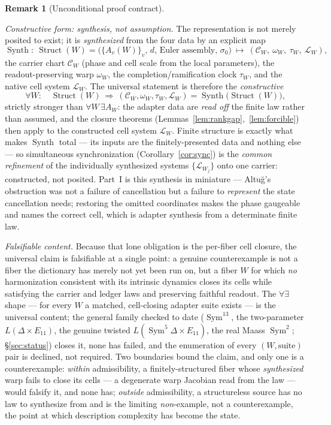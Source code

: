 \documentclass[11pt]{article}
\theoremstyle{definition}
\newtheorem{remark}[theorem]{Remark}
\newcommand{\Sym}{\operatorname{Sym}}
\begin{document}
\begin{remark}[Unconditional proof contract]
\begin{enumerate}
\emph{Constructive form: synthesis, not assumption.} The representation is not merely posited to exist; it is
\emph{synthesized} from the four data by an explicit map
\[
  \operatorname{Synth}:\ \operatorname{Struct}(W)=\big(\{A_v(W)\}_v,\,d,\,\text{Euler assembly},\,\sigma_0\big)
  \ \longmapsto\ (\mathcal C_W,\ \omega_W,\ \tau_W,\ \mathcal L_W),
\]
the carrier chart $\mathcal C_W$ (phase and cell scale from the local parameters), the readout-preserving warp
$\omega_W$, the completion/ramification clock $\tau_W$, and the native cell system $\mathcal L_W$. The universal
statement is therefore the \emph{constructive}
\[
  \forall W:\quad \operatorname{Struct}(W)\ \Longrightarrow\ (\mathcal C_W,\omega_W,\tau_W,\mathcal L_W)
  =\operatorname{Synth}\big(\operatorname{Struct}(W)\big),
\]
strictly stronger than $\forall W\,\exists A_W$: the adapter data are \emph{read off} the finite law rather than
assumed, and the closure theorems (Lemmas~\ref{lem:rankgap},~\ref{lem:forcible}) then apply to the constructed
cell system $\mathcal L_W$. Finite structure is exactly what makes $\operatorname{Synth}$ total --- its inputs are
the finitely-presented data and nothing else --- so simultaneous synchronization (Corollary~\ref{cor:sync}) is the
\emph{common refinement} of the individually synthesized systems $\{\mathcal L_{W_j}\}$ onto one carrier:
constructed, not posited. Part~I is this synthesis in miniature --- Altu\u{g}'s obstruction was not a failure of
cancellation but a failure to \emph{represent} the state cancellation needs; restoring the omitted coordinates
makes the phase gaugeable and names the correct cell, which is adapter synthesis from a determinate finite law.

\emph{Falsifiable content.} Because that lone obligation is the per-fiber cell closure, the universal claim is
falsifiable at a single point: a genuine counterexample is not a fiber the dictionary has merely not yet been run
on, but a fiber $W$ for which \emph{no} harmonization consistent with its intrinsic dynamics closes its cells
while satisfying the carrier and ledger laws and preserving faithful readout. The $\forall\exists$ shape --- for
every $W$ a matched, cell-closing adapter suite exists --- is the universal content; the general family checked to
date ($\Sym^{13}$, the two-parameter $L(\Delta\times E_{11})$, the genuine twisted $L(\Sym^5\Delta\times E_{11})$, the real Maass $\Sym^2$; \S\ref{sec:status})
closes it, none has failed, and the enumeration of every $(W,\text{suite})$ pair is declined, not required. Two boundaries bound the claim, and only one is a counterexample: \emph{within} admissibility, a finitely-structured fiber whose \emph{synthesized} warp fails to close its cells --- a degenerate warp Jacobian read from the law --- would falsify it, and none has; \emph{outside} admissibility, a structureless source has no law to synthesize from and is the limiting \emph{non}-example, not a counterexample, the point at which description complexity has become the state.


\end{enumerate}
\end{remark}
\end{document}
